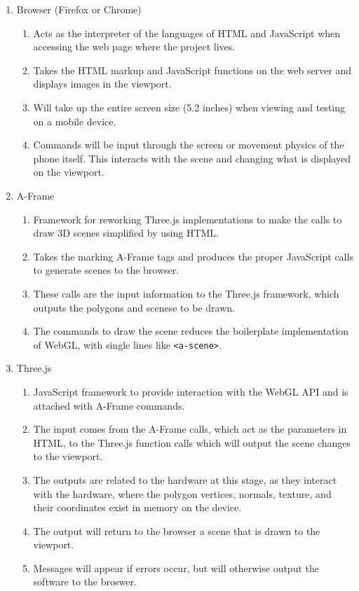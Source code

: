 \documentclass[letterpaper,10pt,draftclsnofoot,onecolumn,compsoc]{IEEEtran}
\begin{document}
\begin{singlespace}
\begin{singlespace}
\begin{enumerate}[labelsep=2em,leftmargin=.5in]
    \item Browser (Firefox or Chrome)
    \begin{enumerate}[leftmargin=*,labelindent=0pt]
        \item Acts as the interpreter of the languages of HTML and JavaScript when accessing the web page where the project lives.
        \item Takes the HTML markup and JavaScript functions on the web server and displays images in the viewport.
        \item Will take up the entire screen size (5.2 inches) when viewing and testing on a mobile device.
        \item Commands will be input through the screen or movement physics of the phone itself. This interacts with the scene and changing what is displayed on the viewport.
    \end{enumerate}
    \item A-Frame
    \begin{enumerate}[leftmargin=*,labelindent=0pt]
        \item Framework for reworking Three.js implementations to make the calls to draw 3D scenes simplified by using HTML.
        \item Takes the marking A-Frame tags and produces the proper JavaScript calls to generate scenes to the browser.
        \item These calls are the input information to the Three.js framework, which outputs the polygons and scenese to be drawn.
        \item The commands to draw the scene reduces the boilerplate implementation of WebGL, with single lines like \texttt{<a-scene>}.
    \end{enumerate}
    \item Three.js
    \begin{enumerate}[leftmargin=*,labelindent=0pt]
        \item JavaScript framework to provide interaction with the WebGL API and is attached with A-Frame commands.
        \item The input comes from the A-Frame calls, which act as the parameters in HTML, to the Three.js function calls which will output the scene changes to the viewport.
        \item The outputs are related to the hardware at this stage, as they interact with the hardware, where the polygon vertices, normals, texture, and their coordinates exist in memory on the device.
        \item The output will return to the browser a scene that is drawn to the viewport.
        \item Messages will appear if errors occur, but will otherwise output the software to the broswer.
    \end{enumerate}
\end{enumerate}


\end{singlespace}
\end{singlespace}
\end{document}
